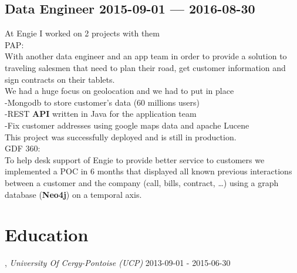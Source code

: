 \documentclass[10pt]{article}
\begin{document}
\subsection{{Data Engineer \hspace*{\fill} 2015-09-01 --- 2016-08-30}}
\smallskip
{}
\medskip
At Engie I worked on 2 projects with them\\
            PAP:\\
            With another data engineer and an app team in order to provide a solution to traveling salesmen that need to plan their road, get customer information and sign contracts on their tablets.\\
            We had a huge focus on geolocation and we had to put in place\\
            -Mongodb to store customer's data (60 millions users)\\
            -REST \textbf{API} written in Java for the application team\\
            -Fix customer addresses using google maps data and apache Lucene\\
            This project was successfully deployed and is still in production.\\
            GDF 360:\\
            To help desk support of Engie to provide better service to customers we implemented a POC in 6 months that displayed all known previous interactions between a customer and the company (call, bills, contract, …) using a graph database (\textbf{Neo4j}) on a temporal axis.\\
\medskip



\section{Education}
, \textit{University Of Cergy-Pontoise (UCP)}	\hfill 2013-09-01 - 2015-06-30
\end{document}
